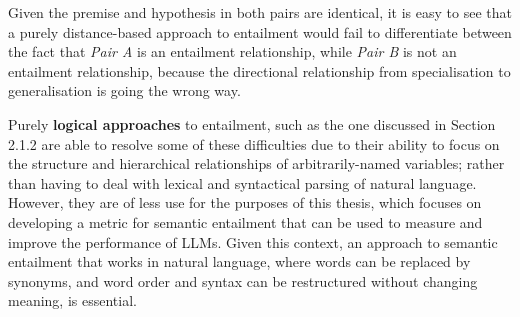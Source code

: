 \documentclass[12pt,twoside]{report}
\begin{document}
Given the premise and hypothesis in both pairs are identical, it is easy to see that a purely distance-based approach to entailment would fail to differentiate between the fact that \textit{Pair A} is an entailment relationship, while \textit{Pair B} is not an entailment relationship, because the directional relationship from specialisation to generalisation is going the wrong way. \newline \par

Purely \textbf{logical approaches} to entailment, such as the one discussed in Section 2.1.2 are able to resolve some of these difficulties due to their ability to focus on the structure and hierarchical relationships of arbitrarily-named variables; rather than having to deal with lexical and syntactical parsing of natural language. However, they are of less use for the purposes of this thesis, which focuses on developing a metric for semantic entailment that can be used to measure and improve the performance of LLMs. Given this context, an approach to semantic entailment that works in natural language, where words can be replaced by synonyms, and word order and syntax can be restructured without changing meaning, is essential. \newline \par
\end{document}
